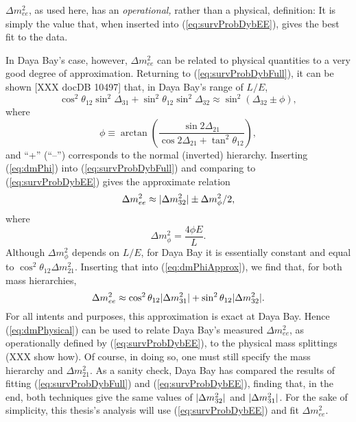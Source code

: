 \documentclass[../thesis.tex]{subfiles}
\begin{document}
\(\Delta m^2_{ee}\), as used here, has an \emph{operational,} rather than a
physical, definition: It is simply the value that, when inserted into
(\ref{eq:survProbDybEE}), gives the best fit to the data.
%
\begin{comment}
  Note that, if Daya Bay only measured antineutrinos at a single $L/E$, we could
  instead have made a truly physical definition of $\Delta m^2_{ee}$ by
  declaring that \[ \sin^2 \Delta_{ee} \equiv \cos^2\theta_{12} \sin^2
    \Delta_{31} + \sin^2\theta_{12} \sin^2 \Delta_{32}. \] However, the
  righthand side of this definition depends on $L/E$, so unless this dependence
  is shown to be negligible, it cannot be used in broadband analyses such as
  Daya Bay's.
\end{comment}
%
In Daya Bay's case, however, \(\Delta m^2_{ee}\) can be related to physical
quantities to a very good degree of approximation. Returning to
(\ref{eq:survProbDybFull}), it can be shown [XXX docDB 10497] that, in Daya
Bay's range of $L/E$,
\begin{equation}
  \label{eq:dmPhi}
  \cos^2\theta_{12} \sin^2\Delta_{31} + \sin^2\theta_{12}\sin^2\Delta_{32}
  \approx \sin^2 (\Delta_{32} \pm \phi),
\end{equation}
where
\begin{equation*}
  \phi \equiv \arctan\left( \frac{\sin2\Delta_{21}}{\cos2\Delta_{21}+ \tan^2
      \theta_{12}} \right),
\end{equation*}
and ``+'' (``--'') corresponds to the normal (inverted) hierarchy. Inserting
(\ref{eq:dmPhi}) into (\ref{eq:survProbDybFull}) and comparing to
(\ref{eq:survProbDybEE}) gives the approximate relation
\begin{equation}
  \label{eq:dmPhiApprox}
  \Delta m^2_{ee} \approx \lvert \Delta m^2_{32}\rvert \pm \Delta m^2_\phi/2,
\end{equation}
where
\begin{equation*}
  \Delta m^2_\phi = \frac{4\phi E}{L}.
\end{equation*}
Although $\Delta m^2_\phi$ depends on $L/E$, for Daya Bay it is essentially
constant and equal to \(\cos^2\theta_{12}\Delta m^2_{21}\). Inserting that into
(\ref{eq:dmPhiApprox}), we find that, for both mass hierarchies,
\begin{equation}
  \label{eq:dmPhysical}
  \Delta m^2_{ee} \approx \cos^2\theta_{12}\lvert \Delta m^2_{31}\rvert + \sin^2\theta_{12}\lvert \Delta m^2_{32}\rvert.
\end{equation}
For all intents and purposes, this approximation is exact at Daya Bay. Hence
(\ref{eq:dmPhysical}) can be used to relate Daya Bay's measured \(\Delta
m^2_{ee}\), as operationally defined by (\ref{eq:survProbDybEE}), to the
physical mass splittings (XXX show how). Of course, in doing so, one must still
specify the mass hierarchy and \(\Delta m^2_{21}.\) As a sanity check, Daya Bay
has compared the results of fitting (\ref{eq:survProbDybFull}) and
(\ref{eq:survProbDybEE}), finding that, in the end, both techniques give the
same values of \(\lvert \Delta m^2_{32}\rvert\) and \(\lvert \Delta m^2_{31}\rvert\). For the
sake of simplicity, this thesis's analysis will use (\ref{eq:survProbDybEE}) and
fit \(\Delta m^2_{ee}\).
\end{document}
